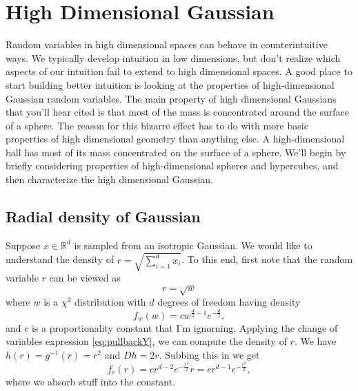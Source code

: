 \documentclass{book}
\newcommand{\R}{\mathbb{R}}
\begin{document}
\section{High Dimensional Gaussian }
Random variables in high dimensional spaces can behave in counterintuitive ways. We typically develop intuition in low dimensions, but don't realize which aspects of our intuition fail to extend to high dimensional spaces. A good place to start building better intuition is looking at the properties of high-dimensional Gaussian random variables. The main property of high dimensional Gaussians that you'll hear cited is that most of the mass is concentrated around the surface of a sphere. The reason for this bizarre effect has to do with more basic properties of high dimensional geometry than anything else. A high-dimensional ball has most of its mass concentrated on the surface of a sphere. We'll begin by briefly considering properties of high-dimensional spheres and hypercubes, and then characterize the high dimensional Gaussian. 

\subsection{Radial density of Gaussian}
Suppose $x\in \R^d$ is sampled from an isotropic Gaussian. We would like to understand the density of $r= \sqrt{\sum_{i=1}^d x_i}$. To this end, first note that the random variable $r$ can be viewed as 
$$
r = \sqrt{w} 
$$
where $w$ is a $\chi^2$ distribution with $d$ degrees of freedom having density
$$
f_w(w) = cw^{\frac{d}{2} - 1}e^{-\frac{d}{2}},
$$
and $c$ is a proportionality constant that I'm ignorning.
Applying the change of variables expression \eqref{eq:pullbackY}, we can compute the density of $r$. We have $h(r) = g^{-1}(r) = r^2$ and $Dh = 2r$. Subbing this in we get
$$
f_r(r) = cr^{d - 2}e^{-\frac{r^2}{2}}r = cr^{d-1}e^{-\frac{r^2}{2}}, 
$$
where we absorb stuff into the constant. 
\end{document}
